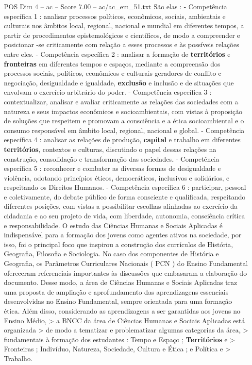 \begin{textsample}{POS Dim 4 – ac – Score 7.00 – ac/ac\_em\_51.txt}
São elas : - Competência específica 1 : analisar processos políticos, econômicos, sociais, ambientais e culturais nos âmbitos local, regional, nacional e mundial em diferentes tempos, a partir de procedimentos epistemológicos e científicos, de modo a compreender e posicionar -se criticamente com relação a esses processos e às possíveis relações entre eles. - Competência específica 2 : analisar a formação de \textbf{territórios} e \textbf{fronteiras} em diferentes tempos e espaços, mediante a compreensão dos processos sociais, políticos, econômicos e culturais geradores de conflito e negociação, desigualdade e igualdade, \textbf{exclusão} e inclusão e de situações que envolvam o exercício arbitrário do poder. - Competência específica 3 : contextualizar, analisar e avaliar criticamente as relações das sociedades com a natureza e seus impactos econômicos e socioambientais, com vistas à proposição de soluções que respeitem e promovam a consciência e a ética socioambiental e o consumo responsável em âmbito local, regional, nacional e global. - Competência específica 4 : analisar as relações de produção, \textbf{capital} e trabalho em diferentes \textbf{territórios}, contextos e culturas, discutindo o papel dessas relações na construção, consolidação e transformação das sociedades. - Competência específica 5 : reconhecer e combater as diversas formas de desigualdade e violência, adotando princípios éticos, democráticos, inclusivos e solidários, e respeitando os Direitos Humanos. - Competência específica 6 : participar, pessoal e coletivamente, do debate público de forma consciente e qualificada, respeitando diferentes posições, com vistas a possibilitar escolhas alinhadas ao exercício da cidadania e ao seu projeto de vida, com liberdade, autonomia, consciência crítica e responsabilidade.
O estudo das Ciências Humanas e Sociais Aplicadas é indispensável para a formação dos jovens como agentes ativos na sociedade, por isso, foi o principal foco que inspirou a construção dos currículos de História, Geografia, Filosofia e Sociologia.
No caso dos componentes de História e Geografia, os Parâmetros Curriculares Nacionais ( PCN ) do Ensino Fundamental ofereceram referenciais importantes às discussões que embasaram a elaboração do documento.
Desse modo, a área de Ciências Humanas e Sociais Aplicadas traz uma proposta de ampliação e aprofundamento das aprendizagens essenciais desenvolvidas no Ensino Fundamental, sempre orientada para uma formação ética.
Além disso, considerando as aprendizagens a ser garantidas aos jovens no Ensino Médio, > a BNCC da área de Ciências Humanas e Sociais Aplicadas está organizada > de modo a tematizar e problematizar algumas categorias da área, > fundamentais à formação dos estudantes : Tempo e Espaço ; \textbf{Territórios} e > Fronteiras ; Indivíduo, Natureza, Sociedade, Cultura e Ética ; e Política e > Trabalho.

\end{textsample}

